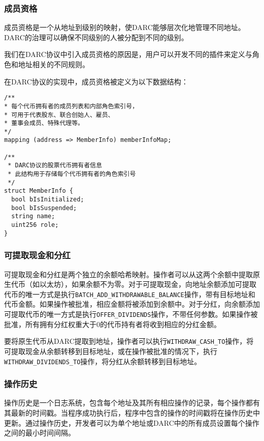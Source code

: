 \documentclass[main.tex]{subfiles}
\begin{document}
\subsubsection{成员资格}

成员资格是一个从地址到级别的映射，使DARC能够层次化地管理不同地址。DARC的治理可以确保不同级别的人被分配到不同的级别。

我们在DARC协议中引入成员资格的原因是，用户可以开发不同的插件来定义与角色和地址相关的不同规则。

在DARC协议的实现中，成员资格被定义为以下数据结构：

\begin{verbatim}
/**
* 每个代币拥有者的成员列表和内部角色索引号，
* 可用于代表股东、联合创始人、雇员、
* 董事会成员、特殊代理等。
*/
mapping (address => MemberInfo) memberInfoMap;

/**
 * DARC协议的股票代币拥有者信息
 * 此结构用于存储每个代币拥有者的角色索引号
 */
struct MemberInfo {
  bool bIsInitialized;
  bool bIsSuspended;
  string name;
  uint256 role;
}
\end{verbatim}


\subsubsection{可提取现金和分红}

可提取现金和分红是两个独立的余额哈希映射。操作者可以从这两个余额中提取原生代币（如以太坊），如果余额不为零。对于可提取现金，向地址余额添加可提取代币的唯一方式是执行\texttt{BATCH\_ADD\_WITHDRAWABLE\_BALANCE}操作，带有目标地址和代币金额。如果操作被批准，相应金额将被添加到余额中。对于分红，向余额添加可提取代币的唯一方式是执行\texttt{OFFER\_DIVIDENDS}操作，不带任何参数。如果操作被批准，所有拥有分红权重大于0的代币持有者将收到相应的分红金额。

要将原生代币从DARC提取到地址，操作者可以执行\texttt{WITHDRAW\_CASH\_TO}操作，将可提取现金从余额转移到目标地址，或在操作被批准的情况下，执行\texttt{WITHDRAW\_DIVIDENDS\_TO}操作，将分红从余额转移到目标地址。

\subsubsection{操作历史}

操作历史是一个日志系统，包含每个地址及其所有相应操作的记录，每个操作都有其最新的时间戳。当程序成功执行后，程序中包含的操作的时间戳将在操作历史中更新。通过操作历史，开发者可以为单个地址或DARC中的所有成员设置每个操作之间的最小时间间隔。
\end{document}

